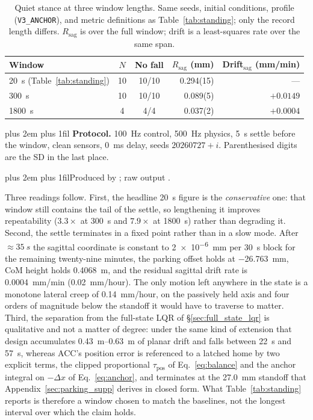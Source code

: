 \documentclass[conference]{IEEEtran}
\newcommand{\tabnote}{\par\leftskip=0pt\rightskip=0pt plus 2em%
  \parfillskip=0pt plus 1fil\relax}
\begin{document}
\begin{table}[t]
\centering
\caption{Quiet stance at three window lengths. Same seeds, initial conditions,
profile (\texttt{V3\_ANCHOR}), and metric definitions as
Table~\ref{tab:standing}; only the record length differs. $R_{\text{sag}}$ is
over the full window; drift is a least-squares rate over the same span.}
\label{tab:longhorizon}
\setlength{\tabcolsep}{4pt}
\footnotesize
\begin{tabular}{@{}lccrr@{}}
\toprule
Window & $N$ & No fall & $R_{\text{sag}}$ (mm) & Drift$_{\text{sag}}$ (mm/min) \\
\midrule
\SI{20}{s} (Table~\ref{tab:standing}) & 10 & 10/10 & 0.294(15) & --- \\
\SI{300}{s}  & 10 & 10/10 & 0.089(5) & $+0.0149$ \\
\SI{1800}{s} & \phantom{0}4 & \phantom{0}4/4 & 0.037(2) & $+0.0004$ \\
\bottomrule
\end{tabular}
\vspace{2pt}\tabnote\noindent
\textbf{Protocol.} \SI{100}{Hz} control, \SI{500}{Hz} physics, \SI{5}{s} settle
before the window, clean sensors, \SI{0}{ms} delay, seeds $20260727{+}i$.
Parenthesised digits are the SD in the last place.
\tabnote\noindent Produced by ; raw output
.
\end{table}

Three readings follow. First, the headline \SI{20}{s} figure is the
\emph{conservative} one: that window still contains the tail of the settle, so
lengthening it improves repeatability ($3.3{\times}$ at \SI{300}{s} and
$7.9{\times}$ at \SI{1800}{s}) rather than degrading it. Second, the settle
terminates in a fixed point rather than in a slow mode. After
${\approx}\SI{35}{s}$ the sagittal coordinate is constant to \SI{2e-6}{mm} per
\SI{30}{s} block for the remaining twenty-nine minutes, the parking offset holds
at \SI{-26.763}{mm}, CoM height holds \SI{0.4068}{m}, and the residual sagittal
drift rate is \SI{0.0004}{mm/min} (\SI{0.02}{mm/hour}). The only motion left
anywhere in the state is a monotone lateral creep of \SI{0.14}{mm/hour}, on the
passively held axis and four orders of magnitude below the standoff it would
have to traverse to matter. Third, the separation from the full-state LQR of
\S\ref{sec:full_state_lqr} is qualitative and not a matter of degree: under the
same kind of extension that design accumulates \SIrange{0.43}{0.63}{m} of planar
drift and falls between \SI{22}{s} and \SI{57}{s}, whereas ACC's position error
is referenced to a latched home by two explicit terms, the clipped proportional
$\tau_{\text{pos}}$ of Eq.~\eqref{eq:balance} and the anchor integral on
$-\Delta x$ of Eq.~\eqref{eq:anchor}, and terminates at the \SI{27.0}{mm}
standoff that Appendix~\ref{sec:parking_supp} derives in closed form. What
Table~\ref{tab:standing} reports is therefore a window chosen to match the
baselines, not the longest interval over which the claim holds.
\end{document}
